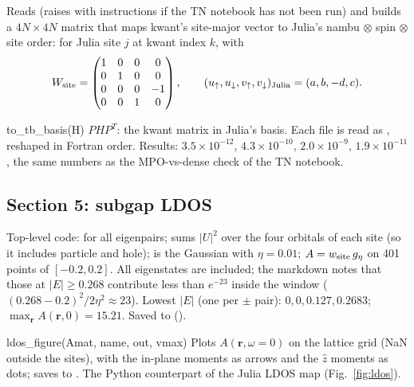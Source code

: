 Reads  (raises  with instructions if the TN notebook has not been run) and builds
a $4N\times4N$ matrix  that maps kwant's site-major vector to Julia's nambu $\otimes$ spin $\otimes$ site order: for Julia site $j$ at
kwant index $k$,  with
\[
W_{\rm site} = \begin{pmatrix}1&0&0&0\\0&1&0&0\\0&0&0&-1\\0&0&1&0\end{pmatrix},\qquad
(u_\uparrow, u_\downarrow, v_\uparrow, v_\downarrow)_{\rm Julia} = (a, b, -d, c).
\]

\begin{function}{to\_tb\_basis(H)}
$P H P^T$: the kwant matrix in Julia's basis. Each  file is read as , reshaped in Fortran order. Results:
 $3.5\times10^{-12}$,  $4.3\times10^{-10}$,  $2.0\times10^{-9}$, 
$1.9\times10^{-11}$, the same numbers as the MPO-vs-dense check of the TN notebook.
\end{function}

\subsection{Section 5: subgap LDOS}

Top-level code:  for all eigenpairs;  sums $|U|^2$ over the four orbitals of each site (so it includes
particle and hole);  is the Gaussian with $\eta = 0.01$; $A = w_{\rm site}\,g_\eta$ on 401 points of $[-0.2, 0.2]$. All eigenstates
are included; the markdown notes that those at $|E|\ge0.268$ contribute less than $e^{-23}$ inside the window
($(0.268-0.2)^2/2\eta^2\approx23$). Lowest $|E|$ (one per $\pm$ pair): $0, 0, 0.127, 0.2683$; $\max_{\mathbf r}A(\mathbf r,0) = 15.21$. Saved to
 ().

\begin{function}{ldos\_figure(Amat, name, out, vmax)}
Plots $A(\mathbf r, \omega=0)$ on the lattice grid (NaN outside the sites), with the in-plane moments as  arrows and the
$\hat z$ moments as dots; saves to . The Python counterpart of the Julia LDOS map (Fig.~\ref{fig:ldos}).
\end{function}

